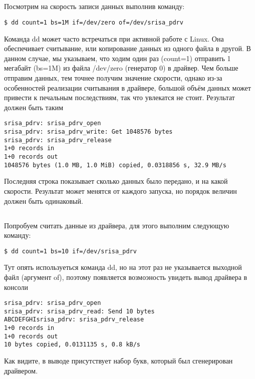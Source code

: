 \subsection{}Посмотрим на скорость записи данных выполнив команду:
\begin{lstlisting}[style=bash]
$ dd count=1 bs=1M if=/dev/zero of=/dev/srisa_pdrv 
\end{lstlisting}
Команда dd может часто встречаться при активной работе с Linux. Она обеспечивает считывание, или копирование данных из одного файла в другой. В данном случае, мы указываем, что ходим один раз (count=1) отправить 1 мегабайт (bs=1M)  из файла /dev/zero (генератор 0) в драйвер. Чем больше отправим данных, тем точнее получим значение скорости, однако из-за особенностей реализации считывания в драйвере, большой объём данных может привести к печальным последствиям, так что увлекатся не стоит. Результат должен быть таким
\begin{lstlisting}[style=stdout]
srisa_pdrv: srisa_pdrv_open
srisa_pdrv: srisa_pdrv_write: Get 1048576 bytes
srisa_pdrv: srisa_pdrv_release 
1+0 records in
1+0 records out
1048576 bytes (1.0 MB, 1.0 MiB) copied, 0.0318856 s, 32.9 MB/s
\end{lstlisting}
Последняя строка показывает сколько данных было передано, и на какой скорости. Результат может менятся от каждого запуска, но порядок величин должен быть одинаковый.

\subsection{}Попробуем считать данные из драйвера, для этого выполним следующую команду: 
\begin{lstlisting}[style=bash]
$ dd count=1 bs=10 if=/dev/srisa_pdrv
\end{lstlisting}
Тут опять используеться команда dd, но на этот раз не указывается выходной файл (аргумент of), поэтому появляется возмоэность увидеть вывод драйвера в консоли
\begin{lstlisting}[style=stdout]
srisa_pdrv: srisa_pdrv_open 
srisa_pdrv: srisa_pdrv_read: Send 10 bytes 
ABCDEFGHIsrisa_pdrv: srisa_pdrv_release 
1+0 records in 
1+0 records out 
10 bytes copied, 0.0131135 s, 0.8 kB/s
\end{lstlisting}
Как видите, в выводе присутствует набор букв, который был сгенерирован драйвером.  

